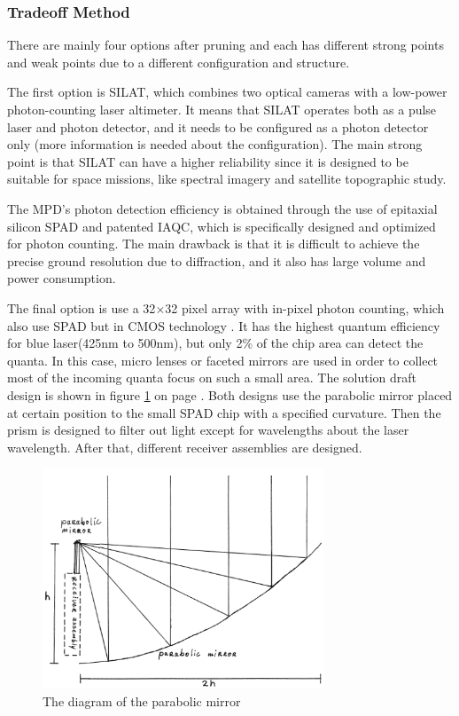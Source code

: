 \subsubsection{Tradeoff Method}
\label{TOReceiverM}
There are mainly four options after pruning and each has different strong points and weak points due to a different configuration and structure. 

The first option is \ac{SILAT}, which combines two optical cameras with a low-power photon-counting laser altimeter. It means that \acs{SILAT} operates both as a pulse laser and photon detector, and it needs to be configured as a photon detector only (more information is needed about the configuration). The main strong point is that \acs{SILAT} can have a higher reliability since it is designed to be suitable for space missions, like spectral imagery and satellite topographic study.

The \ac{MPD}'s photon detection efficiency is obtained through the use of epitaxial silicon \ac{SPAD} and patented \ac{IAQC}, which is specifically designed and optimized for photon counting. The main drawback is that it is difficult to achieve the precise ground resolution due to diffraction, and it also has large volume and power consumption.

The final option is use a 32$\times$32 pixel array with in-pixel photon counting, which also use \acs{SPAD} but in \ac{CMOS} technology \cite{SPAD}. It has the highest quantum efficiency for blue laser(425nm to 500nm), but only 2\% of the chip area can detect the quanta. In this case, micro lenses or faceted mirrors are used in order to collect most of the incoming quanta focus on such a small area. The solution draft design is shown in figure \ref{fig:diagram_Rgeneral} on page \pageref{fig:diagram_Rgeneral}. Both designs use the parabolic mirror placed at certain position to the small \acs{SPAD} chip with a specified curvature. Then the prism is designed to filter out light except for wavelengths about the laser wavelength. After that, different receiver assemblies are designed.

\begin{figure}[ht!]
\centering
\includegraphics[width=0.75\textwidth]{chapters/img/DiagramReceiverGeneral.png}
\caption{The diagram of the parabolic mirror}
\label{fig:diagram_Rgeneral}
\end{figure}

